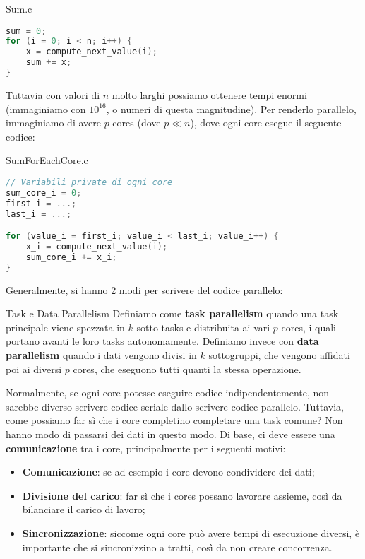 \begin{codeblock}{Sum.c}
    \begin{lstlisting}[language = c]
sum = 0;
for (i = 0; i < n; i++) {
	x = compute_next_value(i);
	sum += x;
}   \end{lstlisting}
\end{codeblock}

Tuttavia con valori di $n$ molto larghi possiamo ottenere tempi enormi (immaginiamo con $10^{16}$, o numeri di questa magnitudine). Per renderlo parallelo, immaginiamo di avere $p$ cores (dove $p \ll n$), dove ogni core esegue il seguente codice:

\begin{codeblock}{SumForEachCore.c}
    \begin{lstlisting}[language = c]
// Variabili private di ogni core
sum_core_i = 0;
first_i = ...;
last_i = ...;

for (value_i = first_i; value_i < last_i; value_i++) {
	x_i = compute_next_value(i);
	sum_core_i += x_i;
}   \end{lstlisting}
\end{codeblock}

Generalmente, si hanno 2 modi per scrivere del codice parallelo:

\begin{definition}{Task e Data Parallelism}
    Definiamo come \textbf{task parallelism} quando una task principale viene spezzata in $k$ sotto-tasks e distribuita ai vari $p$ cores, i quali portano avanti le loro tasks autonomamente.
    \nwl
    Definiamo invece con \textbf{data parallelism} quando i dati vengono divisi in $k$ sottogruppi, che vengono affidati poi ai diversi $p$ cores, che eseguono tutti quanti la stessa operazione.
\end{definition}

Normalmente, se ogni core potesse eseguire codice indipendentemente, non sarebbe diverso scrivere codice seriale dallo scrivere codice parallelo. Tuttavia, come possiamo far sì che i core completino completare una task comune? Non hanno modo di passarsi dei dati in questo modo. Di base, ci deve essere una \textbf{comunicazione} tra i core, principalmente per i seguenti motivi:
\begin{itemize}
    \item \textbf{Comunicazione}: se ad esempio i core devono condividere dei dati;
    \item \textbf{Divisione del carico}: far sì che i cores possano lavorare assieme, così da bilanciare il carico di lavoro;
    \item \textbf{Sincronizzazione}: siccome ogni core può avere tempi di esecuzione diversi, è importante che si sincronizzino a tratti, così da non creare concorrenza.
\end{itemize}

